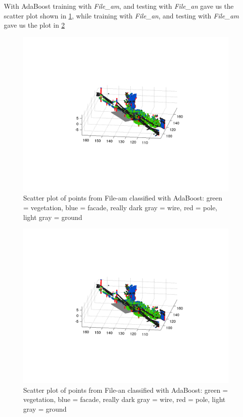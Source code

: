 \documentclass[letterpaper]{article}
\begin{document}
With AdaBoost training with \textit{File\_am}, and testing with \textit{File\_an} gave us the scatter plot shown in \ref{Fig_Ada1}, while training with \textit{File\_an}, and testing with \textit{File\_am} gave us the plot in \ref{Fig_Ada2}
\begin{figure}
\includegraphics[width=\linewidth]{boost_trainam_testan.png}
\caption{Scatter plot of points from File-am classified with AdaBoost: green = vegetation, blue = facade, really dark gray = wire, red = pole, light gray = ground}
\label{Fig_Ada1}
\end{figure}
\begin{figure}
\includegraphics[width=\linewidth]{boost_trainam_testan.png}
\caption{Scatter plot of points from File-an classified with AdaBoost: green = vegetation, blue = facade, really dark gray = wire, red = pole, light gray = ground}
\label{Fig_Ada2}
\end{figure}
\end{document}
